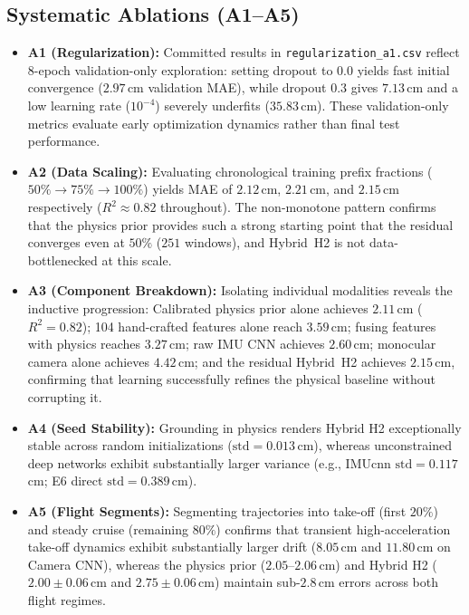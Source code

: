 \subsection{Systematic Ablations (A1--A5)}
\begin{itemize}
    \item \textbf{A1 (Regularization):} Committed results in \texttt{regularization\_a1.csv} reflect 8-epoch validation-only exploration: setting dropout to $0.0$ yields fast initial convergence ($2.97$\,cm validation MAE), while dropout $0.3$ gives $7.13$\,cm and a low learning rate ($10^{-4}$) severely underfits ($35.83$\,cm). These validation-only metrics evaluate early optimization dynamics rather than final test performance.
    \item \textbf{A2 (Data Scaling):} Evaluating chronological training prefix fractions ($50\% \to 75\% \to 100\%$) yields MAE of $2.12$\,cm, $2.21$\,cm, and $2.15$\,cm respectively ($R^2 \approx 0.82$ throughout). The non-monotone pattern confirms that the physics prior provides such a strong starting point that the residual converges even at $50\%$ ($251$ windows), and Hybrid~H2 is not data-bottlenecked at this scale.
    \item \textbf{A3 (Component Breakdown):} Isolating individual modalities reveals the inductive progression: Calibrated physics prior alone achieves $2.11$\,cm ($R^2 = 0.82$); 104 hand-crafted features alone reach $3.59$\,cm; fusing features with physics reaches $3.27$\,cm; raw IMU CNN achieves $2.60$\,cm; monocular camera alone achieves $4.42$\,cm; and the residual Hybrid~H2 achieves $2.15$\,cm, confirming that learning successfully refines the physical baseline without corrupting it.
    \item \textbf{A4 (Seed Stability):} Grounding in physics renders Hybrid H2 exceptionally stable across random initializations ($\mathrm{std} = 0.013$\,cm), whereas unconstrained deep networks exhibit substantially larger variance (e.g., IMUcnn $\mathrm{std} = 0.117$\,cm; E6 direct $\mathrm{std} = 0.389$\,cm).
    \item \textbf{A5 (Flight Segments):} Segmenting trajectories into take-off (first $20\%$) and steady cruise (remaining $80\%$) confirms that transient high-acceleration take-off dynamics exhibit substantially larger drift ($8.05$\,cm and $11.80$\,cm on Camera CNN), whereas the physics prior ($2.05$--$2.06$\,cm) and Hybrid H2 ($2.00 \pm 0.06$\,cm and $2.75 \pm 0.06$\,cm) maintain sub-$2.8$\,cm errors across both flight regimes.
\end{itemize}

